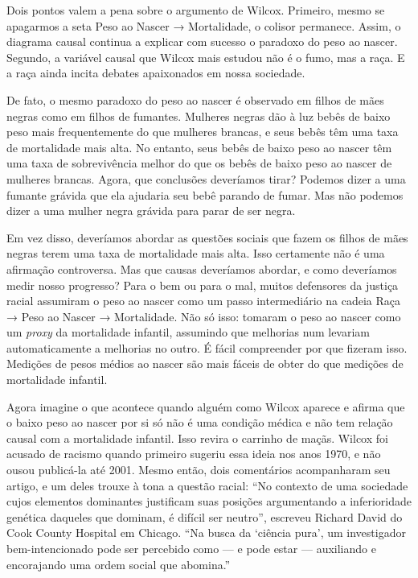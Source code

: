 \documentclass[11pt,a5paper,twoside]{book}
\begin{document}
Dois pontos valem a pena sobre o argumento de Wilcox. Primeiro, mesmo se apagarmos a seta Peso ao Nascer → Mortalidade, o colisor permanece. Assim, o diagrama causal continua a explicar com sucesso o paradoxo do peso ao nascer. Segundo, a variável causal que Wilcox mais estudou não é o fumo, mas a raça. E a raça ainda incita debates apaixonados em nossa sociedade.

De fato, o mesmo paradoxo do peso ao nascer é observado em filhos de mães negras como em filhos de fumantes. Mulheres negras dão à luz bebês de baixo peso mais frequentemente do que mulheres brancas, e seus bebês têm uma taxa de mortalidade mais alta. No entanto, seus bebês de baixo peso ao nascer têm uma taxa de sobrevivência melhor do que os bebês de baixo peso ao nascer de mulheres brancas. Agora, que conclusões deveríamos tirar? Podemos dizer a uma fumante grávida que ela ajudaria seu bebê parando de fumar. Mas não podemos dizer a uma mulher negra grávida para parar de ser negra.

Em vez disso, deveríamos abordar as questões sociais que fazem os filhos de mães negras terem uma taxa de mortalidade mais alta. Isso certamente não é uma afirmação controversa. Mas que causas deveríamos abordar, e como deveríamos medir nosso progresso? Para o bem ou para o mal, muitos defensores da justiça racial assumiram o peso ao nascer como um passo intermediário na cadeia Raça → Peso ao Nascer → Mortalidade. Não só isso: tomaram o peso ao nascer como um \textit{proxy} da mortalidade infantil, assumindo que melhorias num levariam automaticamente a melhorias no outro. É fácil compreender por que fizeram isso. Medições de pesos médios ao nascer são mais fáceis de obter do que medições de mortalidade infantil.

Agora imagine o que acontece quando alguém como Wilcox aparece e afirma que o baixo peso ao nascer por si só não é uma condição médica e não tem relação causal com a mortalidade infantil. Isso revira o carrinho de maçãs. Wilcox foi acusado de racismo quando primeiro sugeriu essa ideia nos anos 1970, e não ousou publicá-la até 2001. Mesmo então, dois comentários acompanharam seu artigo, e um deles trouxe à tona a questão racial: “No contexto de uma sociedade cujos elementos dominantes justificam suas posições argumentando a inferioridade genética daqueles que dominam, é difícil ser neutro”, escreveu Richard David do Cook County Hospital em Chicago. “Na busca da ‘ciência pura’, um investigador bem-intencionado pode ser percebido como — e pode estar — auxiliando e encorajando uma ordem social que abomina.”
\end{document}
